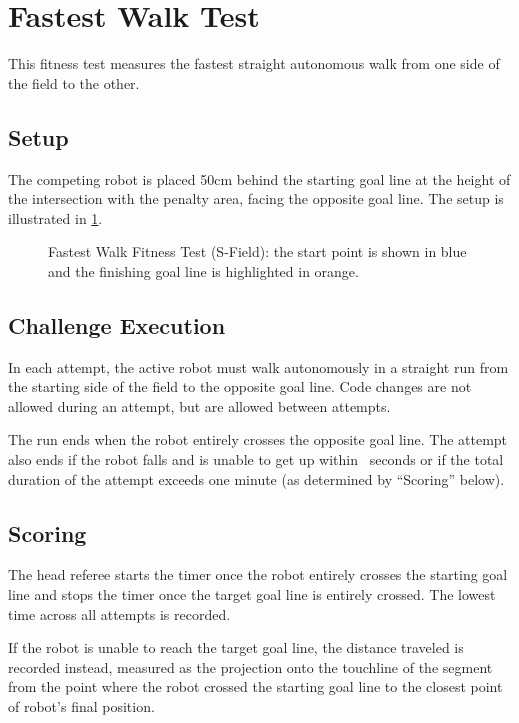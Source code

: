 
\section{Fastest Walk Test}
This fitness test measures the fastest straight autonomous walk from one side of the field to the other.

\subsection{Setup}
The competing robot is placed 50cm behind the starting goal line at the height of the intersection with the penalty area, facing the opposite goal line.
The setup is illustrated in \cref{fig:walk_test_s}.

\begin{figure}[ht]
    \centering
    
    \caption{Fastest Walk Fitness Test (S-Field): the start point is shown in blue and the finishing goal line is highlighted in orange.}
    \label{fig:walk_test_s}
\end{figure}

\subsection{Challenge Execution}
In each attempt, the active robot must walk autonomously in a straight run from the starting side of the field to the opposite goal line.
Code changes are not allowed during an attempt, but are allowed between attempts.

The run ends when the robot entirely crosses the opposite goal line. The attempt also ends if the robot falls and is unable to get up within \FallenRobotGetUpTime~seconds or if the total duration of the attempt exceeds one minute (as determined by ``Scoring'' below).

\subsection{Scoring}
The head referee starts the timer once the robot entirely crosses the starting goal line and stops the timer once the target goal line is entirely crossed. The lowest time across all attempts is recorded. 

If the robot is unable to reach the target goal line, the distance traveled is recorded instead, measured as the projection onto the touchline of the segment from the point where the robot crossed the starting goal line to the closest point of robot's final position.

